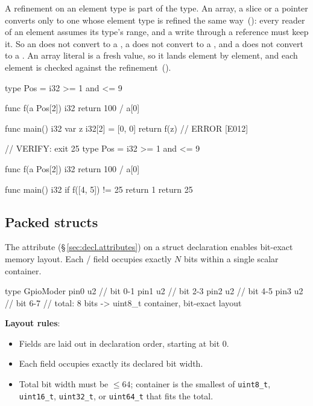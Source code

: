 \pnum
A refinement on an element type is part of the type.  An array, a slice or a pointer converts only
to one whose element type is refined the same way~(): every reader of an element
assumes its type's range, and a write through a  reference must keep it.  So an
 does not convert to a , a  does not convert to a
, and a  does not convert to a .  An array literal is a
fresh value, so it lands element by element, and each element is checked against the
refinement~().

\begin{laincode}
type Pos = i32 >= 1 and <= 9

func f(a Pos[2]) i32 { return 100 / a[0] }

func main() i32 {
    var z i32[2] = [0, 0]
    return f(z)    // ERROR [E012]
}
\end{laincode}

\begin{laincode}
// VERIFY: exit 25
type Pos = i32 >= 1 and <= 9

func f(a Pos[2]) i32 { return 100 / a[0] }

func main() i32 {
    if f([4, 5]) != 25 { return 1 }
    return 25
}
\end{laincode}

\subsection{Packed structs}
\label{sec:types.packed-future}

\pnum
The \tok{[packed]} attribute (\S\,\ref{sec:decl.attributes}) on a struct
declaration enables bit-exact memory layout. Each /
field occupies exactly \(N\) bits within a single scalar container.

\begin{laincode}
[packed]
type GpioModer {
    pin0 u2     // bit 0-1
    pin1 u2     // bit 2-3
    pin2 u2     // bit 4-5
    pin3 u2     // bit 6-7
}
// total: 8 bits -> uint8_t container, bit-exact layout
\end{laincode}

\pnum
\textbf{Layout rules}:
\begin{itemize}
  \item Fields are laid out in declaration order, starting at bit 0.
  \item Each field occupies exactly its declared bit width.
  \item Total bit width must be \(\leq 64\); container is the smallest
        of \texttt{uint8\_t}, \texttt{uint16\_t}, \texttt{uint32\_t}, or
        \texttt{uint64\_t} that fits the total.
\end{itemize}

